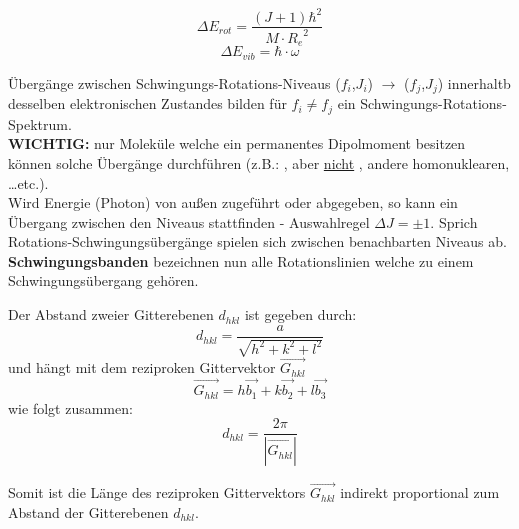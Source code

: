 \[\Delta E_{rot} = \frac{(J+1)\hbar^2}{M\cdot {R_e}^2}\]
\[\Delta E_{vib} = \hbar \cdot \omega\]

\label{q:3}

Übergänge zwischen Schwingungs-Rotations-Niveaus ($f_i$,$J_i$) $\rightarrow$ ($f_j$,$J_j$) innerhaltb desselben elektronischen Zustandes bilden für $f_i \neq f_j$ ein Schwingungs-Rotations-Spektrum. \\

\textbf{WICHTIG:} nur Moleküle welche ein permanentes Dipolmoment besitzen können solche Übergänge durchführen (z.B.: ,  aber \underline{nicht} , andere homonuklearen, \dots etc.). \\

Wird Energie (Photon) von außen zugeführt oder abgegeben, so kann ein Übergang zwischen den Niveaus stattfinden - Auswahlregel $\Delta J = \pm 1$. Sprich Rotations-Schwingungsübergänge spielen sich zwischen benachbarten Niveaus ab.\\

\textbf{Schwingungsbanden} bezeichnen nun alle Rotationslinien welche zu einem Schwingungsübergang gehören. \\


\label{q:4}

Der Abstand zweier Gitterebenen $d_{hkl}$ ist gegeben durch:
\[d_{hkl} = \frac{a}{\sqrt{h^2 + k^2 + l^2}}\]
und hängt mit dem reziproken Gittervektor $\vec{G_{hkl}}$ 
\[\vec{G_{hkl}} = h\vec{b_1} + k\vec{b_2} + l\vec{b_3}\]
wie folgt zusammen:
\[d_{hkl} = \frac{2\pi}{|\vec{G_{hkl}}|}\]

Somit ist die Länge des reziproken Gittervektors $\vec{G_{hkl}}$ indirekt proportional zum Abstand der Gitterebenen $d_{hkl}$.

\label{q:5}


